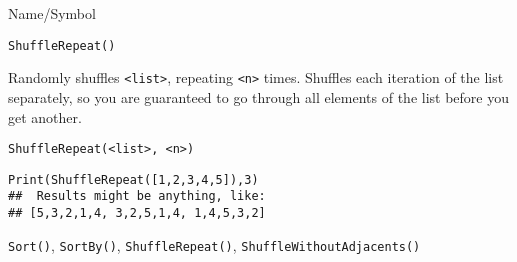 \begin{desc}{Name/Symbol}
\item[Name/Symbol] 	\verb+ShuffleRepeat()+

\item[Description] 	Randomly shuffles  \verb+<list>+, repeating \verb+<n>+ times.  Shuffles
  each iteration of the list separately, so you are guaranteed to go
  through all elements of the list before you get another.

\item[Usage]    
\begin{verbatim}
ShuffleRepeat(<list>, <n>)
\end{verbatim}

\item[Example]
\begin{verbatim}
Print(ShuffleRepeat([1,2,3,4,5]),3)
##  Results might be anything, like:
## [5,3,2,1,4, 3,2,5,1,4, 1,4,5,3,2]
\end{verbatim}

\item[See Also]    	\verb+Sort()+, \verb+SortBy()+, \verb+ShuffleRepeat()+,
                    \verb+ShuffleWithoutAdjacents()+
\end{desc}

\rl



